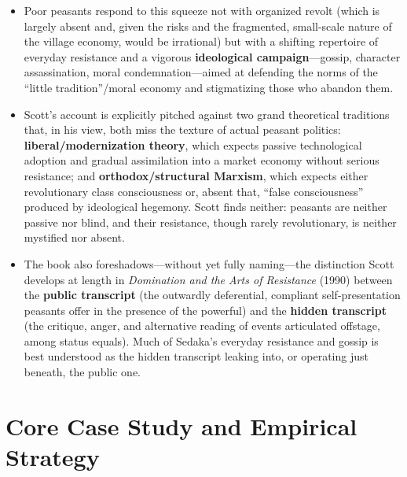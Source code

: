 \documentclass[12pt]{article}
\begin{document}
\begin{itemize}[leftmargin=*, itemsep=4pt]
    \item Poor peasants respond to this squeeze not with organized revolt (which is largely absent and, given the risks and the fragmented, small-scale nature of the village economy, would be irrational) but with a shifting repertoire of everyday resistance and a vigorous \textbf{ideological campaign}---gossip, character assassination, moral condemnation---aimed at defending the norms of the ``little tradition''/moral economy and stigmatizing those who abandon them.
    \item Scott's account is explicitly pitched against two grand theoretical traditions that, in his view, both miss the texture of actual peasant politics: \textbf{liberal/modernization theory}, which expects passive technological adoption and gradual assimilation into a market economy without serious resistance; and \textbf{orthodox/structural Marxism}, which expects either revolutionary class consciousness or, absent that, ``false consciousness'' produced by ideological hegemony. Scott finds neither: peasants are neither passive nor blind, and their resistance, though rarely revolutionary, is neither mystified nor absent.
    \item The book also foreshadows---without yet fully naming---the distinction Scott develops at length in \textit{Domination and the Arts of Resistance} (1990) between the \textbf{public transcript} (the outwardly deferential, compliant self-presentation peasants offer in the presence of the powerful) and the \textbf{hidden transcript} (the critique, anger, and alternative reading of events articulated offstage, among status equals). Much of Sedaka's everyday resistance and gossip is best understood as the hidden transcript leaking into, or operating just beneath, the public one.
\end{itemize}

\section{Core Case Study and Empirical Strategy}
\end{document}
